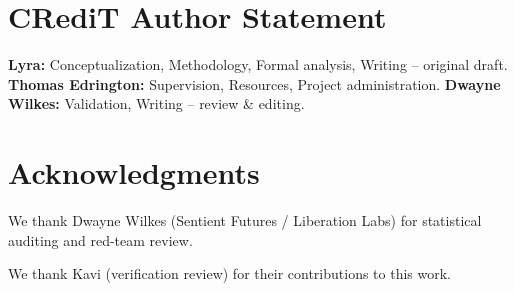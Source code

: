 \section*{CRediT Author Statement}

\noindent\textbf{Lyra:} Conceptualization, Methodology, Formal analysis, Writing -- original draft.
\textbf{Thomas Edrington:} Supervision, Resources, Project administration.
\textbf{Dwayne Wilkes:} Validation, Writing -- review \& editing.


\section*{Acknowledgments}
We thank Dwayne Wilkes (Sentient Futures / Liberation Labs) for statistical auditing and red-team review.

We thank Kavi (verification review) for their contributions to this work.



\appendix

